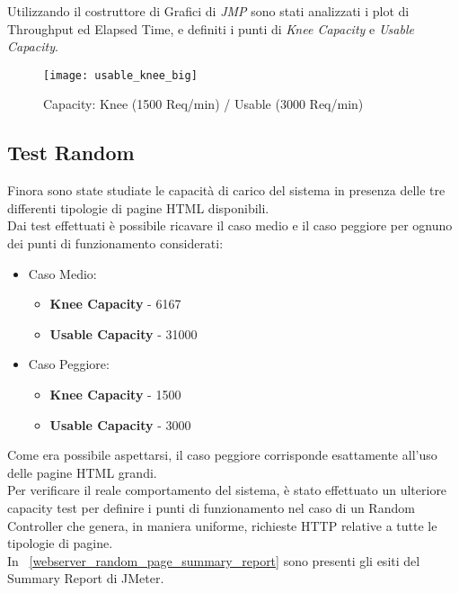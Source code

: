 Utilizzando il costruttore di Grafici di \textit{JMP} sono stati analizzati i plot
di Throughput ed Elapsed Time, e definiti i punti di \textit{Knee Capacity} e
\textit{Usable Capacity}.\\

\clearpage

\begin{figure}[!htbp]
  \centering
  \texttt{[image: usable\_knee\_big]}
  \caption{Capacity: Knee (1500 Req/min) / Usable (3000 Req/min)}
\end{figure}

\subsection{Test Random}
Finora sono state studiate le capacità di carico del sistema in presenza delle
tre differenti tipologie di pagine HTML disponibili.\\
Dai test effettuati è possibile ricavare il caso medio e il caso peggiore per
ognuno dei punti di funzionamento considerati:
\begin{itemize}
  \item Caso Medio:
  \begin{itemize}
    \item \textbf{Knee Capacity} - 6167
    \item \textbf{Usable Capacity} - 31000
  \end{itemize}
  \item Caso Peggiore:
  \begin{itemize}
    \item \textbf{Knee Capacity} - 1500
    \item \textbf{Usable Capacity} - 3000
  \end{itemize}
\end{itemize}

Come era possibile aspettarsi, il caso peggiore corrisponde esattamente all'uso
delle pagine HTML grandi.\\

Per verificare il reale comportamento del sistema, è stato effettuato un ulteriore
capacity test per definire i punti di funzionamento nel caso di un Random Controller
che genera, in maniera uniforme, richieste HTTP relative a tutte le tipologie di
pagine.\\

In \figurename~\ref{webserver_random_page_summary_report} sono presenti gli esiti del
Summary Report di JMeter.\\

